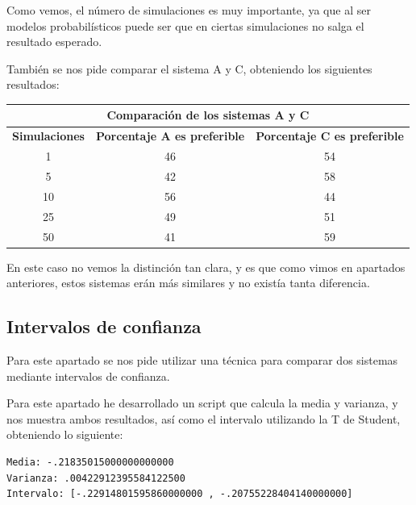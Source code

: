 \documentclass[12pt, spanish]{article}
\begin{document}
Como vemos, el número de simulaciones es muy importante, ya que al ser modelos probabilísticos puede ser que en ciertas simulaciones no salga el resultado esperado.


También se nos pide comparar el sistema A y C, obteniendo los siguientes resultados:

\begin{table}[H]
\centering
\begin{tabular}{|c|c|c|}
\hline
\multicolumn{3}{|c|}{\textbf{Comparación de los sistemas A y C}}                                  \\ \hline
\textbf{Simulaciones} & \textbf{Porcentaje A es preferible} & \textbf{Porcentaje C es preferible} \\ \hline
1                     & 46                                  & 54                                  \\ \hline
5                     & 42                                  & 58                                  \\ \hline
10                    & 56                                  & 44                                  \\ \hline
25                    & 49                                  & 51                                  \\ \hline
50                    & 41                                  & 59                                  \\ \hline
\end{tabular}
\end{table}

En este caso no vemos la distinción tan clara, y es que como vimos en apartados anteriores, estos sistemas erán más similares y no existía tanta diferencia.



\newpage

\subsection{Intervalos de confianza}

Para este apartado se nos pide utilizar una técnica para comparar dos sistemas mediante intervalos de confianza.

Para este apartado he desarrollado un script que calcula la media y varianza, y nos muestra ambos resultados, así como el intervalo utilizando la T de Student, obteniendo lo siguiente:

\begin{lstlisting}
Media: -.21835015000000000000
Varianza: .00422912395584122500
Intervalo: [-.22914801595860000000 , -.20755228404140000000]
\end{lstlisting}
\end{document}
